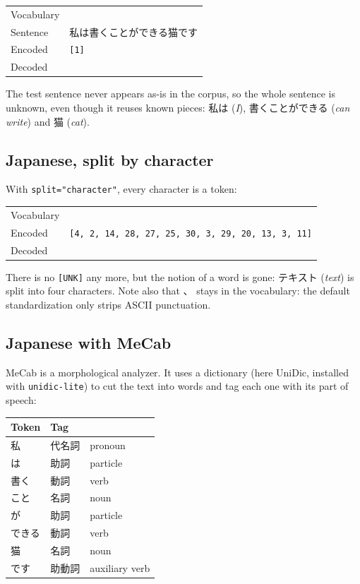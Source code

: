 \documentclass[11pt,a4paper]{article}
\makeatletter
\newcommand\code[1]{\texttt{#1}}
\newenvironment{result}
  {\par\smallskip\noindent\begin{tabular}{@{}l p{0.78\textwidth}@{}}}
  {\end{tabular}\par\smallskip}
\newcommand\row[2]{\textsf{\small\color{muted}#1} & #2 \\[3pt]}
\makeatother
\begin{document}
\begin{result}
  \row{Vocabulary}{\tokens[ja]{UNK|私は猫ではありません|私は別のテキストです|私はテキストです|我思う、ゆえに我あり|作家は書くことができる}}
  \row{Sentence}{私は書くことができる猫です}
  \row{Encoded}{\code{[1]}}
  \row{Decoded}{\tokens[ja]{UNK}}
\end{result}

The test sentence never appears as-is in the corpus, so the whole sentence is
unknown, even though it reuses known pieces: 私は (\emph{I}), 書くことができる
(\emph{can write}) and 猫 (\emph{cat}).

\subsection{Japanese, split by character}

With \code{split="character"}, every character is a token:

\begin{result}
  \row{Vocabulary}{\tokens[ja]{UNK|は|で|私|我|ト|テ|ス|キ|り|す|あ|猫|書|思|家|別|作|ん|る|ゆ|ま|の|に|と|せ|こ|く|き|が|え|う|、}}
  \row{Encoded}{\code{[4, 2, 14, 28, 27, 25, 30, 3, 29, 20, 13, 3, 11]}}
  \row{Decoded}{\tokens[ja]{私|は|書|く|こ|と|が|で|き|る|猫|で|す}}
\end{result}

There is no \code{[UNK]} any more, but the notion of a word is gone: テキスト
(\emph{text}) is split into four characters. Note also that 、 stays in the
vocabulary: the default standardization only strips ASCII punctuation.

\subsection{Japanese with MeCab}

MeCab is a morphological analyzer. It uses a dictionary (here UniDic, installed
with \code{unidic-lite}) to cut the text into words and tag each one with its
part of speech:

\begin{center}
\begin{tabular}{l l l}
  \toprule
  Token & Tag & \\
  \midrule
  私 & 代名詞 & pronoun \\
  は & 助詞 & particle \\
  書く & 動詞 & verb \\
  こと & 名詞 & noun \\
  が & 助詞 & particle \\
  できる & 動詞 & verb \\
  猫 & 名詞 & noun \\
  です & 助動詞 & auxiliary verb \\
  \bottomrule
\end{tabular}
\end{center}
\end{document}
